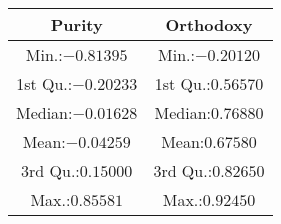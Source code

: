 \begin{tabular}{cc}
	\addlinespace
	\toprule
	Purity&Orthodoxy\\
	\midrule
	Min.:$-0.81395$&Min.:$-0.20120$\\
	1st Qu.:$-0.20233$&1st Qu.:$0.56570$\\
	Median:$-0.01628$&Median:$0.76880$\\
	Mean:$-0.04259$&Mean:$0.67580$\\
	3rd Qu.:$0.15000$&3rd Qu.:$0.82650$\\
	Max.:$0.85581$&Max.:$0.92450$\\
	\bottomrule
\end{tabular}
